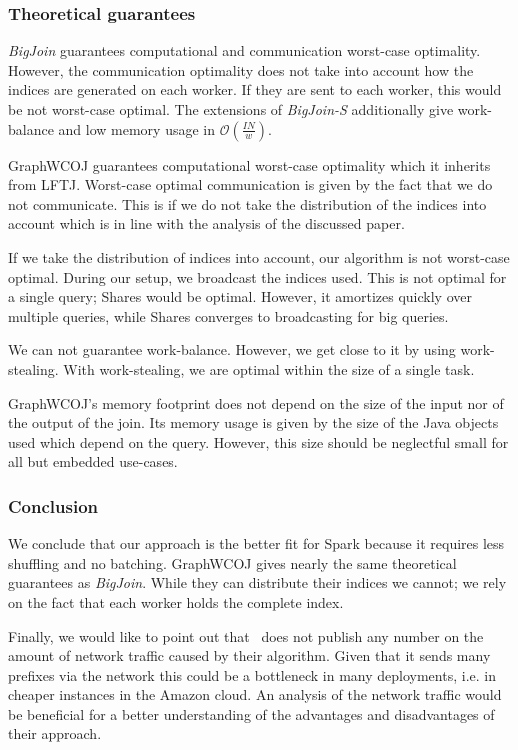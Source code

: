 \subsubsection{Theoretical guarantees}
\textit{BigJoin} guarantees computational and communication worst-case optimality.
However, the communication optimality does not take into account how the indices are generated on each worker.
If they are sent to each worker, this would be not worst-case optimal.
The extensions of \textit{BigJoin-S} additionally give work-balance and low memory usage in $\mathcal{O} (\frac{IN}{w})$.

GraphWCOJ guarantees computational worst-case optimality which it inherits from \textsc{LFTJ}.
Worst-case optimal communication is given by the fact that we do not communicate.
This is if we do not take the distribution of the indices into account which is in line with the analysis of the discussed paper.

If we take the distribution of indices into account, our algorithm is not worst-case optimal.
During our setup, we broadcast the indices used.
This is not optimal for a single query;
Shares would be optimal.
However, it amortizes quickly over multiple queries, while Shares converges to broadcasting for big queries.

We can not guarantee work-balance.
However, we get close to it by using work-stealing.
With work-stealing, we are optimal within the size of a single task.

GraphWCOJ's memory footprint does not depend on the size of the input nor of the output of the join.
Its memory usage is given by the size of the Java objects used which depend on the query.
However, this size should be neglectful small for all but embedded use-cases.

\subsubsection{Conclusion}
We conclude that our approach is the better fit for Spark because it requires less shuffling and no batching.
GraphWCOJ gives nearly the same theoretical guarantees as \textit{BigJoin}.
While they can distribute their indices we cannot;
we rely on the fact that each worker holds the complete index.

Finally, we would like to point out that~\cite{ammar2018distributed} does not publish any number on the amount
of network traffic caused by their algorithm.
Given that it sends many prefixes via the network this could be a bottleneck in many deployments, i.e. in cheaper instances
in the Amazon cloud.
An analysis of the network traffic would be beneficial for a better understanding of the advantages and disadvantages
of their approach.

